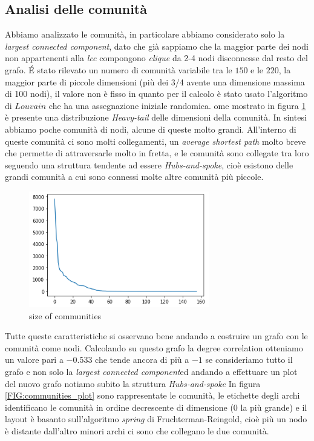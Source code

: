 \documentclass[a4paper]{article}
\newcommand{\lcc}{\textit{largest connected component}}
\begin{document}
\subsection{Analisi delle comunità}
Abbiamo analizzato le comunità, in particolare abbiamo considerato solo la \lcc, dato che già sappiamo che la maggior parte dei nodi non appartenenti alla \textit{lcc} compongono \textit{clique} da 2-4 nodi disconnesse dal resto del grafo.
É stato rilevato un numero di comunità variabile tra le $150 \text{ e le } 220$, la maggior parte di piccole dimensioni (più dei 3/4 avente una dimensione massima di 100 nodi), il valore non è fisso in quanto per il calcolo è stato usato l'algoritmo di $Louvain$ che ha una assegnazione iniziale randomica.
ome mostrato in figura \ref{FIG:communities_sizes} è presente una distribuzione \textit{Heavy-tail} delle dimensioni della comunità.
In sintesi abbiamo poche comunità di nodi, alcune di queste molto grandi.
All'interno di queste comunità ci sono molti collegamenti, un \textit{average shortest path} molto breve che permette di attraversarle molto in fretta, e le comunità sono collegate tra loro seguendo una struttura tendente ad essere \textit{Hubs-and-spoke}, cioè esistono delle grandi comunità a cui sono connessi molte altre comunità più piccole. \\
\begin{figure}[!ht]
\centering
\includegraphics[width=0.7\textwidth]{community_size.png}
\caption{size of communities} \label{FIG:communities_sizes}
\end{figure}
Tutte queste caratteristiche si osservano bene andando a costruire un grafo con le comunità come nodi.
Calcolando su questo grafo la degree correlation otteniamo un valore pari a $-0.533$ che tende ancora di più a $-1$ se consideriamo tutto il grafo e non solo la \lcc ed andando a effettuare un plot del nuovo grafo notiamo subito la struttura \textit{Hubs-and-spoke}
In figura \ref{FIG:communities_plot} sono rappresentate le comunità, le etichette degli archi identificano le comunità in ordine decrescente di dimensione (0 la più grande) e il layout è basanto sull'algoritmo \textit{spring} di Fruchterman-Reingold, cioè più un nodo è distante dall'altro minori archi ci sono che collegano le due comunità.\\
\end{document}
